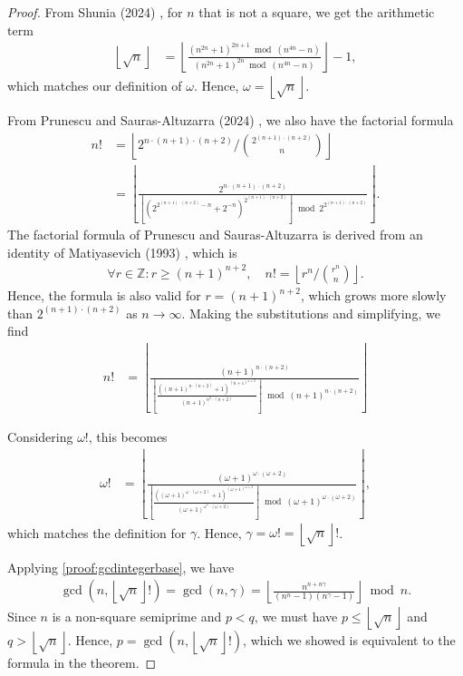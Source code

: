 \documentclass[11pt,reqno]{article}
\theoremstyle{plain}
\theoremstyle{definition}
\newcommand{\floor}[1]{\left\lfloor #1 \right\rfloor}
\newcommand{\Z}{\mathbb{Z}}
\begin{document}
\begin{proof}
From Shunia (2024) \cite{shunia2024polynomial}, for $n$ that is not a square, we get the arithmetic term
\begin{align*}
\floor{\sqrt{n}} &=
\floor{\frac{(n^{2n} + 1)^{2n+1} \bmod (n^{4n}-n)}{(n^{2n} + 1)^{2n} \bmod (n^{4n}-n)}} - 1 ,
\end{align*}
which matches our definition of $\omega$. Hence, $\omega = \floor{\sqrt{n}}$.

From Prunescu and Sauras-Altuzarra (2024) \cite{prunescu2024factorial}, we also have the factorial formula
\begin{align*}
n! &= \floor{2^{n\cdot(n+1)\cdot(n+2)} / \binom{2^{(n+1)\cdot(n+2)}}{n}} \\
&= \floor
{
    \frac
    {
        2^{n\cdot(n+1)\cdot(n+2)}
    }
    {
        \floor
        {
            \left(
                2^{2^{(n+1)\cdot(n+2)}-n} + 2^{-n}
            \right)^{2^{(n+1)\cdot(n+2)}}
        }
        \bmod
        2^{2^{(n+1)\cdot(n+2)}}
    }
} .
\end{align*}
The factorial formula of Prunescu and Sauras-Altuzarra is derived from an identity of Matiyasevich (1993) \cite{matiyasevich1993hilbert}, which is
\begin{align*}
    \forall r \in \Z : r \geq (n+1)^{n+2},
    \quad
    n! = \floor{r^n / \binom{r^n}{n}} .
\end{align*}
Hence, the formula is also valid for $r=(n+1)^{n+2}$, which grows more slowly than $2^{(n+1)\cdot(n+2)}$ as $n\rightarrow\infty$. Making the substitutions and simplifying, we find
\begin{align*}
n! &= \floor
{
    \frac
    {
        (n+1)^{n\cdot(n+2)}
    }
    {
        \floor
        {
            \frac
            {
            \left( (n+1)^{n\cdot(n+2)} + 1 \right)^{(n+1)^{n+2}}
            }
            {
            (n+1)^{n^2\cdot(n+2)}
            }
        }
        \bmod (n+1)^{n\cdot(n+2)}
    }
}
\end{align*}

Considering $\omega!$, this becomes
\begin{align*}
\omega! &= \floor
{
    \frac
    {
        (\omega+1)^{\omega\cdot(\omega+2)}
    }
    {
        \floor
        {
            \frac
            {
            \left( (\omega+1)^{\omega\cdot(\omega+2)} + 1 \right)^{(\omega+1)^{\omega+2}}
            }
            {
            (\omega+1)^{\omega^2\cdot(\omega+2)}
            }
        }
        \bmod (\omega+1)^{\omega\cdot(\omega+2)}
    }
} ,
\end{align*}
which matches the definition for $\gamma$. Hence, $\gamma = \omega! = \floor{\sqrt{n}}!$.

Applying \cref{proof:gcdintegerbase}, we have
\begin{align*}
    \gcd(n, \floor{\sqrt{n}}!) = \gcd(n,\gamma) = \floor{\frac{n^{n+n\gamma}}{(n^n-1)(n^{\gamma}-1)}}\bmod n .
\end{align*}
Since $n$ is a non-square semiprime and $p < q$, we must have $p \leq \floor{\sqrt{n}}$ and $q > \floor{\sqrt{n}}$. Hence, $p = \gcd(n,\floor{\sqrt{n}}!)$, which we showed is equivalent to the formula in the theorem.
\end{proof}
\end{document}
